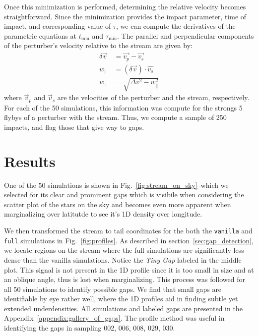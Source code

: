 \documentclass[draft]{aa}
\begin{document}
    Once this minimization is performed, determining the relative velocity becomes straightforward. Since the minimization provides the impact parameter, time of impact, and corresponding value of $\tau$, we can compute the derivatives of the parametric equations at $t_{\text{min}}$ and $\tau_{\text{min}}$. The parallel and perpendicular components of the perturber's velocity relative to the stream are given by:
    \begin{equation}
      \begin{aligned}
        \delta \vec{v} &=\vec{v_p} - \vec{v_s} \\
        w_\parallel &= \left(\delta \vec{v}\right)\cdot \hat{v_s}\\  
        w_\perp &=  \sqrt{\Delta v ^2 - w_\parallel ^ 2}
        \end{aligned}
      \end{equation}
    where $\vec{v}_p$ and $\vec{v}_s$ are the velocities of the perturber and the stream, respectively. For each of the 50 simulations, this information was compute for the strongs 5 flybys of a perturber with the stream. Thus, we compute a sample of 250 impacts, and flag those that give way to gaps. 


\section{Results}

  One of the 50 simulations is shown in Fig.~\ref{fig:stream_on_sky}--which we selected for its clear and prominent gaps which is visibile when considering the scatter plot of the stars on the sky and becomes even more apparent when marginalizing over latitutde to see it's 1D density over longitude. 

  We then transformed the stream to tail coordinates for the both the \texttt{vanilla} and \texttt{full} simulations in Fig.~\ref{fig:profiles}. As described in section~\ref{sec:gap_detection}, we locate regions on the stream where the full simulations are significantly less dense than the vanilla simulations. Notice the \textit{Tiny Gap} labeled in the middle plot. This signal is not present in the 1D profile since it is too small in size and at an oblique angle, thus is lost when marginalizing. This process was followed for all 50 simulations to identify possible gaps. We find that small gaps are identifiable by eye rather well, where the 1D profiles aid in finding subtle yet extended underdensities. All simulations and labeled gaps are presented in the Appendix~\ref{appendix:gallery_of_gaps}. The profile method was useful in identifying the gaps in sampling 002, 006, 008, 029, 030. 
  
\end{document}
